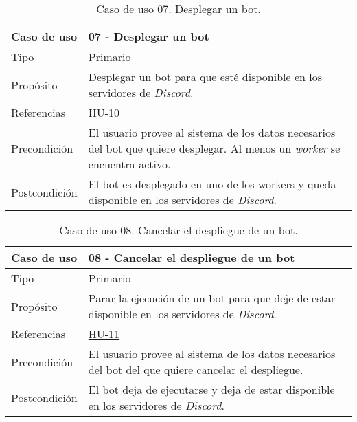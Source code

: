 \begin{table}[H]
    \centering
    \def\arraystretch{1.25}
    \begin{adjustbox}{max width=\textwidth}
    \begin{tabularx}{\textwidth}{|l|L|}
    \hline
        \textbf{Caso de uso} & \textbf{07 - Desplegar un bot} \\ \hline
    \hline
        Tipo & Primario \\ \hline
        Propósito & Desplegar un bot para que esté disponible en los servidores de \textit{Discord}. \\ \hline
        Referencias & \hyperref[sec:hu10]{HU-10} \\ \hline
        Precondición & El usuario provee al sistema de los datos necesarios del bot que quiere desplegar. Al menos un \textit{worker} se encuentra activo. \\ \hline
        Postcondición & El bot es desplegado en uno de los workers y queda disponible en los servidores de \textit{Discord}. \\ \hline
    \end{tabularx}
    \end{adjustbox}
    \caption{Caso de uso 07. Desplegar un bot.}
\end{table}

\begin{table}[H]
    \centering
    \def\arraystretch{1.25}
    \begin{adjustbox}{max width=\textwidth}
    \begin{tabularx}{\textwidth}{|l|L|}
    \hline
        \textbf{Caso de uso} & \textbf{08 - Cancelar el despliegue de un bot} \\ \hline
    \hline
        Tipo & Primario \\ \hline
        Propósito & Parar la ejecución de un bot para que deje de estar disponible en los servidores de \textit{Discord}. \\ \hline
        Referencias & \hyperref[sec:hu11]{HU-11} \\ \hline
        Precondición & El usuario provee al sistema de los datos necesarios del bot del que quiere cancelar el despliegue. \\ \hline
        Postcondición & El bot deja de ejecutarse y deja de estar disponible en los servidores de \textit{Discord}. \\ \hline
    \end{tabularx}
    \end{adjustbox}
    \caption{Caso de uso 08. Cancelar el despliegue de un bot.}
\end{table}

